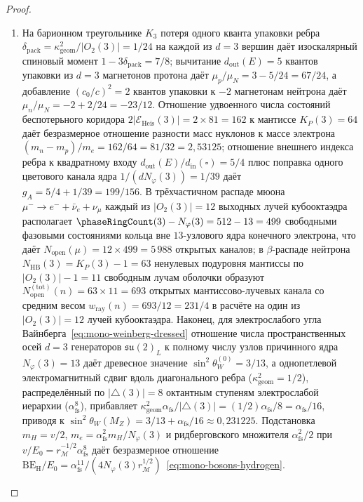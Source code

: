 \begin{proof}
\begin{enumerate}[label=\textbf{\arabic*.},leftmargin=*]
\item На барионном треугольнике $K_3$ потеря одного кванта упаковки ребра $\delta_{\mathrm{pack}} = \kappa_{\mathrm{geom}}^2 / |O_2(3)| = 1/24$ на каждой из $d = 3$ вершин даёт изоскалярный спиновый момент $1 - 3\delta_{\mathrm{pack}} = 7/8$; вычитание $d_{\mathrm{out}}(E) = 5$ квантов упаковки из $d = 3$ магнетонов протона даёт $\mu_p/\mu_N = 3 - 5/24 = 67/24$, а добавление $(c_0/c)^2 = 2$ квантов упаковки к $-2$ магнетонам нейтрона даёт $\mu_n/\mu_N = -2 + 2/24 = -23/12$. Отношение удвоенного числа состояний беспотерьного коридора $2|\mathcal{E}_{\mathrm{Heis}}(3)| = 2\times 81 = 162$ к мантиссе $K_P(3) = 64$ даёт безразмерное отношение разности масс нуклонов к массе электрона $(m_n - m_p)/m_e = 162/64 = 81/32 = 2{,}53125$; отношение внешнего индекса ребра к квадратному входу $d_{\mathrm{out}}(E)/d_{\mathrm{in}}(\square) = 5/4$ плюс поправка одного цветового канала ядра $1/(d N_\varphi(3)) = 1/39$ даёт $g_A = 5/4 + 1/39 = 199/156$. В трёхчастичном распаде мюона $\mu^- \to e^- + \bar{\nu}_e + \nu_\mu$ каждый из $|O_2(3)| = 12$ выходных лучей кубооктаэдра располагает $\phaseRingCount(3) - N_\varphi(3) = 512 - 13 = 499$ свободными фазовыми состояниями кольца вне $13$-узлового ядра конечного электрона, что даёт $N_{\mathrm{open}}(\mu) = 12 \times 499 = 5\,988$ открытых каналов; в $\beta$-распаде нейтрона $N_{\mathrm{HB}}(3) = K_P(3) - 1 = 63$ ненулевых подуровня мантиссы по $|O_2(3)| - 1 = 11$ свободным лучам оболочки образуют $N_{\mathrm{open}}^{(\mathrm{tot})}(n) = 63 \times 11 = 693$ открытых мантиссово-лучевых канала со средним весом $w_{\mathrm{ray}}(n) = 693 / 12 = 231/4$ в расчёте на один из $|O_2(3)| = 12$ лучей кубооктаэдра. Наконец, для электрослабого угла Вайнберга~\eqref{eq:mono-weinberg-dressed} отношение числа пространственных осей $d = 3$ генераторов $\mathfrak{su}(2)_L$ к полному числу узлов причинного ядра $N_\varphi(3) = 13$ даёт древесное значение $\sin^2\theta_W^{(0)} = 3/13$, а однопетлевой электромагнитный сдвиг вдоль диагонального ребра ($\kappa_{\mathrm{geom}}^2 = 1/2$), распределённый по $|{\triangle}(3)| = 8$ октантным ступеням электрослабой иерархии ($\alpha_{\mathrm{fs}}^8$), прибавляет $\kappa_{\mathrm{geom}}^2\alpha_{\mathrm{fs}} / |{\triangle}(3)| = (1/2)\alpha_{\mathrm{fs}} / 8 = \alpha_{\mathrm{fs}} / 16$, приводя к $\sin^2\theta_W(M_Z) = 3/13 + \alpha_{\mathrm{fs}}/16 \approx 0{,}231225$. Подстановка $m_H = v/2$, $m_e = \alpha_{\mathrm{fs}}^2 m_H / N_\varphi(3)$ и ридберговского множителя $\alpha_{\mathrm{fs}}^2 / 2$ при $v / E_0 = r_{\mathcal{M}}^{-1/2}\alpha_{\mathrm{fs}}^8$ даёт безразмерное отношение $\mathrm{BE}_{\mathrm{H}} / E_0 = \alpha_{\mathrm{fs}}^{11} / (4 N_\varphi(3) r_{\mathcal{M}}^{1/2})$~\eqref{eq:mono-bosons-hydrogen}.
\end{enumerate}
\end{proof}

